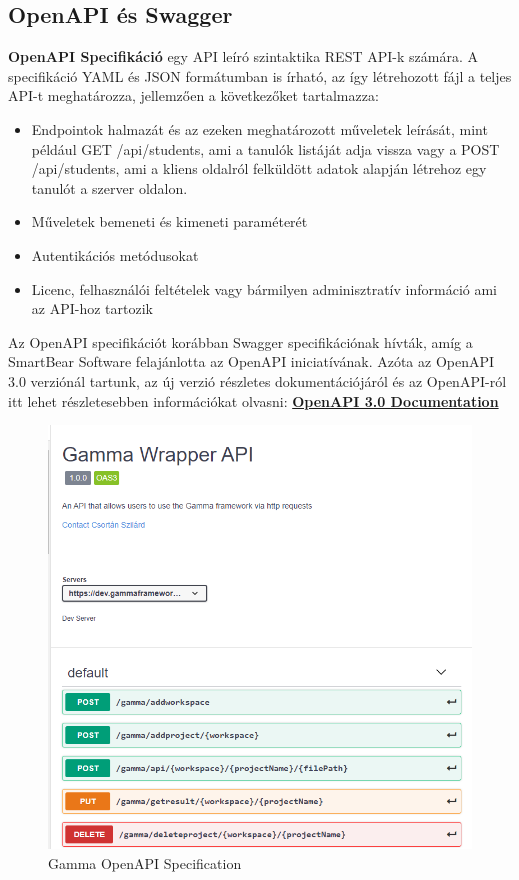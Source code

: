 \subsection{OpenAPI és Swagger}
\textbf{OpenAPI Specifikáció} egy API leíró szintaktika REST API-k számára. A specifikáció YAML és JSON formátumban is írható, az így létrehozott fájl a teljes API-t meghatározza, jellemzően a következőket tartalmazza:
\begin{itemize}
	\item Endpointok halmazát és az ezeken meghatározott műveletek leírását, mint például GET /api/students, ami a tanulók listáját adja vissza vagy a POST /api/students, ami a kliens oldalról felküldött adatok alapján létrehoz egy tanulót a szerver oldalon.
	\item Műveletek bemeneti és kimeneti paraméterét
	\item Autentikációs metódusokat
	\item Licenc, felhasználói feltételek vagy bármilyen adminisztratív információ ami az API-hoz tartozik
\end{itemize}

Az OpenAPI specifikációt korábban Swagger specifikációnak hívták, amíg a SmartBear Software felajánlotta az OpenAPI iniciatívának. Azóta az OpenAPI 3.0 verziónál tartunk, az új verzió részletes dokumentációjáról és az OpenAPI-ról itt lehet részletesebben információkat olvasni: \textbf{\href{https://www.openapis.org/blog/2017/07/26/the-oai-announces-the-openapi-specification-3-0-0}{OpenAPI 3.0 Documentation}}

\begin{figure}[!ht]
	\includegraphics[width=150mm, keepaspectratio]{figures/swagerr_UI.png}
	\caption{Gamma OpenAPI Specification}
	\label{fig:openAPI_swagger}
\end{figure}

